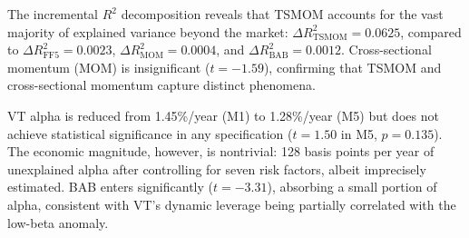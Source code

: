\documentclass[12pt,a4paper]{article}
\begin{document}
The incremental $R^2$ decomposition reveals that TSMOM accounts for the vast majority of explained variance beyond the market: $\Delta R^2_{\text{TSMOM}} = 0.0625$, compared to $\Delta R^2_{\text{FF5}} = 0.0023$, $\Delta R^2_{\text{MOM}} = 0.0004$, and $\Delta R^2_{\text{BAB}} = 0.0012$. Cross-sectional momentum (MOM) is insignificant ($t = -1.59$), confirming that TSMOM and cross-sectional momentum capture distinct phenomena.

VT alpha is reduced from 1.45\%/year (M1) to 1.28\%/year (M5) but does not achieve statistical significance in any specification ($t = 1.50$ in M5, $p = 0.135$). The economic magnitude, however, is nontrivial: 128 basis points per year of unexplained alpha after controlling for seven risk factors, albeit imprecisely estimated. BAB enters significantly ($t = -3.31$), absorbing a small portion of alpha, consistent with VT's dynamic leverage being partially correlated with the low-beta anomaly.
\end{document}
